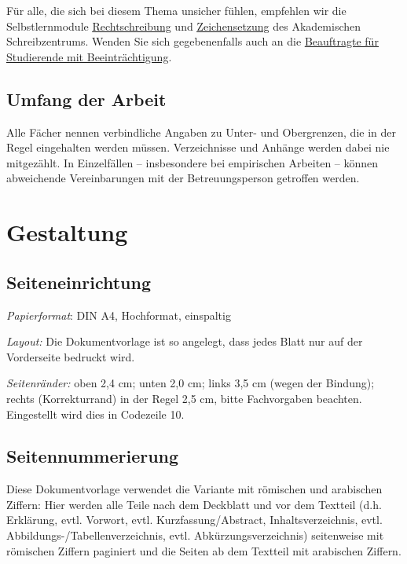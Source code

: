 \documentclass[a4paper,11pt]{article}%
\renewcommand{\\}{\vspace*{0.5\baselineskip} \newline}
\begin{document}
Für alle, die sich bei diesem Thema unsicher fühlen, empfehlen wir die Selbstlernmodule \href{https://ilias.th-koeln.de/ilias.php?baseClass=ilRepositoryGUI}{\underline{Rechtschreibung}} und \href{https://ilias.th-koeln.de/ilias.php?baseClass=ilRepositoryGUI}{\underline{Zeichensetzung}} des Akademischen Schreibzentrums. Wenden Sie sich gegebenenfalls auch an die \href{https://www.th-koeln.de/personen/nadine.sohn/}{\underline{Beauftragte für Studierende mit Beeinträchtigung}}.



\subsection{Umfang der Arbeit}

Alle Fächer nennen verbindliche Angaben zu Unter- und Obergrenzen, die in der Regel eingehalten werden müssen. Verzeichnisse und Anhänge werden dabei nie mitgezählt. In Einzelfällen – insbesondere bei empirischen Arbeiten – können abweichende Vereinbarungen mit der Betreuungsperson getroffen werden.



\section{Gestaltung}

\subsection{Seiteneinrichtung}

\textit{Papierformat}: DIN A4, Hochformat, einspaltig \\

\textit{Layout:} Die Dokumentvorlage ist so angelegt, dass jedes Blatt nur auf der Vorderseite bedruckt wird. \\

\textit{Seitenränder:} oben 2,4 cm; unten 2,0 cm; links 3,5 cm (wegen der Bindung); rechts (Korrekturrand) in der Regel 2,5 cm, bitte Fachvorgaben beachten. Eingestellt wird dies in Codezeile 10.



\subsection{Seitennummerierung}

Diese Dokumentvorlage verwendet die Variante mit römischen und arabischen Ziffern: Hier werden alle Teile nach dem Deckblatt und vor dem Textteil (d.h. Erklärung, evtl. Vorwort, evtl. Kurzfassung/Abstract, Inhaltsverzeichnis, evtl. Abbildungs-/Tabellenverzeichnis, evtl. Abkürzungsverzeichnis) seitenweise mit römischen Ziffern paginiert und die Seiten ab dem Textteil mit arabischen Ziffern.\\
\end{document}
